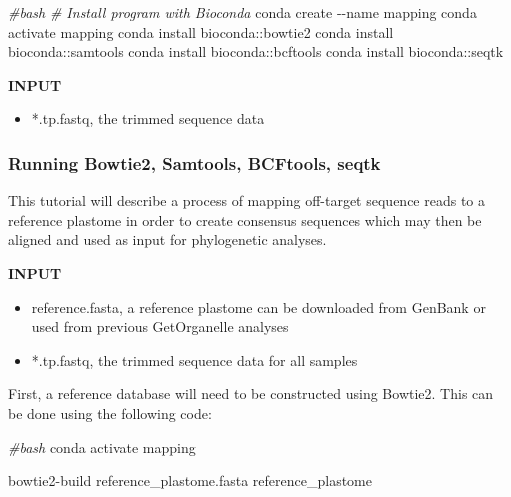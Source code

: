 \documentclass[
  12pt,
]{article}
\newenvironment{Shaded}{\begin{snugshade}}{\end{snugshade}}
\newcommand{\AttributeTok}[1]{\textcolor[rgb]{0.13,0.29,0.53}{#1}}
\newcommand{\CommentTok}[1]{\textcolor[rgb]{0.56,0.35,0.01}{\textit{#1}}}
\newcommand{\ExtensionTok}[1]{#1}
\newcommand{\NormalTok}[1]{#1}
\providecommand{\tightlist}{%
  \setlength{\itemsep}{0pt}\setlength{\parskip}{0pt}}
\begin{document}
\begin{Shaded}
\begin{Highlighting}[]
\CommentTok{\#bash}
\CommentTok{\# Install program with Bioconda}
\ExtensionTok{conda}\NormalTok{ create }\AttributeTok{{-}{-}name}\NormalTok{ mapping}
\ExtensionTok{conda}\NormalTok{ activate mapping}
\ExtensionTok{conda}\NormalTok{ install bioconda::bowtie2}
\ExtensionTok{conda}\NormalTok{ install bioconda::samtools}
\ExtensionTok{conda}\NormalTok{ install bioconda::bcftools}
\ExtensionTok{conda}\NormalTok{ install bioconda::seqtk}
\end{Highlighting}
\end{Shaded}

\textbf{INPUT}

\begin{itemize}
\tightlist
\item
  *.tp.fastq, the trimmed sequence data
\end{itemize}

\hypertarget{running-bowtie2-samtools-bcftools-seqtk}{%
\subsubsection{Running Bowtie2, Samtools, BCFtools, seqtk}\label{running-bowtie2-samtools-bcftools-seqtk}}

This tutorial will describe a process of mapping off-target sequence reads to a reference plastome in order to create consensus sequences which may then be aligned and used as input for phylogenetic analyses.

\textbf{INPUT}

\begin{itemize}
\tightlist
\item
  reference.fasta, a reference plastome can be downloaded from GenBank or used from previous GetOrganelle analyses
\item
  *.tp.fastq, the trimmed sequence data for all samples
\end{itemize}

First, a reference database will need to be constructed using Bowtie2. This can be done using the following code:

\begin{Shaded}
\begin{Highlighting}[]
\CommentTok{\#bash}
\ExtensionTok{conda}\NormalTok{ activate mapping}

\ExtensionTok{bowtie2{-}build}\NormalTok{ reference\_plastome.fasta reference\_plastome}
\end{Highlighting}
\end{Shaded}
\end{document}
